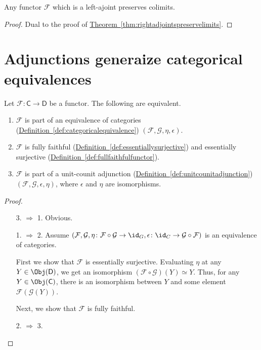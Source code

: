 \documentclass[notes.tex]{subfiles}
\begin{document}
\begin{corollary}
  \label{cor:leftadjointspreservecolimits}
  Any functor $\mathcal{F}$ which is a left-ajoint preserves colimits.
\end{corollary}
\begin{proof}
  Dual to the proof of \hyperref[thm:rightadjointspreservelimits]{Theorem~\ref*{thm:rightadjointspreservelimits}}.
\end{proof}

\section{Adjunctions generaize categorical equivalences}
\label{sec:adjunctions_generaize_categorical_equivalences}

\begin{theorem}
  Let $\mathcal{F}\colon \mathsf{C} \to \mathsf{D}$ be a functor. The following are equivalent.
  \begin{enumerate}
    \item $\mathcal{F}$ is part of an equivalence of categories (\hyperref[def:categoricalequivalence]{Definition~\ref*{def:categoricalequivalence}}) $(\mathcal{F}, \mathcal{G}, \eta, \epsilon)$.

    \item $\mathcal{F}$ is fully faithful (\hyperref[def:essentiallysurjective]{Definition~\ref*{def:essentiallysurjective}}) and essentially surjective (\hyperref[def:fullfaithfulfunctor]{Definition~\ref*{def:fullfaithfulfunctor}}).

    \item $\mathcal{F}$ is part of a unit-counit adjunction (\hyperref[def:unitcounitadjunction]{Definition~\ref*{def:unitcounitadjunction}}) $(\mathcal{F}, \mathcal{G}, \epsilon, \eta)$, where $\epsilon$ and $\eta$ are isomorphisms.
  \end{enumerate}
\end{theorem}
\begin{proof}
  \leavevmode
  \begin{enumerate}
    \item[3. $\Rightarrow$ 1.] Obvious.
            
    \item[1. $\Rightarrow$ 2.] Assume $(\mathcal{F}, \mathcal{G}, \eta\colon \mathcal{F} \circ \mathcal{G} \to \id_{G}, \epsilon\colon \id_{C} \to \mathcal{G} \circ \mathcal{F})$ is an equivalence of categories. 
      
      First we show that $\mathcal{F}$ is essentially surjective. Evaluating $\eta$ at any $Y \in \Obj(\mathsf{D})$, we get an isomorphism $(\mathcal{F} \circ \mathcal{G})(Y) \simeq Y$. Thus, for any $Y \in \Obj(\mathsf{C})$, there is an isomorphism between $Y$ and some element $\mathcal{F}(\mathcal{G}(Y))$.

      Next, we show that $\mathcal{F}$ is fully faithful.
            
    \item[2. $\Rightarrow$ 3.]
  \end{enumerate}
\end{proof}
\end{document}
